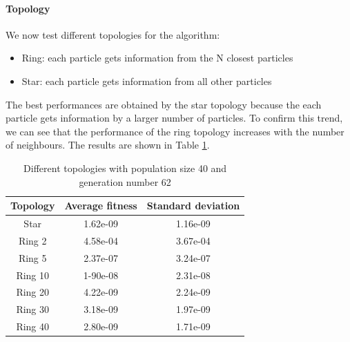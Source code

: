 \paragraph*{Topology}
We now test different topologies for the algorithm:
\begin{itemize}
    \item Ring: each particle gets information from the N closest particles
    \item Star: each particle gets information from all other particles
\end{itemize}
The best performances are obtained by the star topology because the each particle gets information by a larger number of particles. To confirm this trend, we can see that the performance of the ring topology increases with the number of neighbours. The results are shown in Table \ref{tab:pso-topology}.
\begin{table}[H]
    \centering
    \begin{tabular}{|c|c|c|}
        Topology & Average fitness & Standard deviation \\ \hline
        Star     & 1.62e-09        & 1.16e-09           \\
        Ring 2   & 4.58e-04        & 3.67e-04           \\
        Ring 5   & 2.37e-07        & 3.24e-07           \\
        Ring 10  & 1-90e-08        & 2.31e-08           \\
        Ring 20  & 4.22e-09        & 2.24e-09           \\
        Ring 30  & 3.18e-09        & 1.97e-09           \\
        Ring 40  & 2.80e-09        & 1.71e-09           \\
    \end{tabular}
    \caption{Different topologies with population size 40 and generation number 62}
    \label{tab:pso-topology}
\end{table}